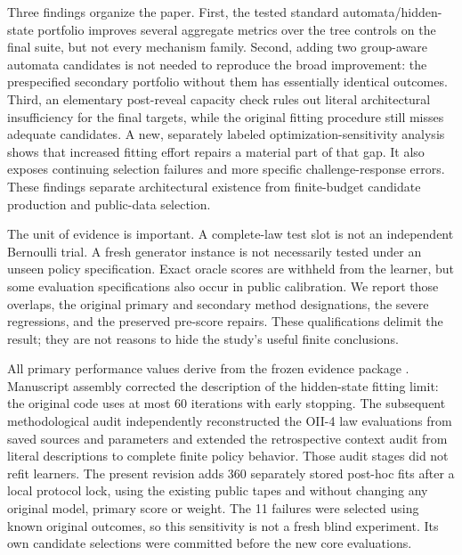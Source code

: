 Three findings organize the paper. First, the tested standard automata/hidden-state portfolio improves several aggregate metrics over the tree controls on the final suite, but not every mechanism family. Second, adding two group-aware automata candidates is not needed to reproduce the broad improvement: the prespecified secondary portfolio without them has essentially identical outcomes. Third, an elementary post-reveal capacity check rules out literal architectural insufficiency for the final targets, while the original fitting procedure still misses adequate candidates. A new, separately labeled optimization-sensitivity analysis shows that increased fitting effort repairs a material part of that gap. It also exposes continuing selection failures and more specific challenge-response errors. These findings separate architectural existence from finite-budget candidate production and public-data selection.

The unit of evidence is important. A complete-law test slot is not an independent Bernoulli trial. A fresh generator instance is not necessarily tested under an unseen policy specification. Exact oracle scores are withheld from the learner, but some evaluation specifications also occur in public calibration. We report those overlaps, the original primary and secondary method designations, the severe regressions, and the preserved pre-score repairs. These qualifications delimit the result; they are not reasons to hide the study's useful finite conclusions.

All primary performance values derive from the frozen evidence package \cite{RodgersEvidence}. Manuscript assembly corrected the description of the hidden-state fitting limit: the original code uses at most 60 iterations with early stopping. The subsequent methodological audit independently reconstructed the OII-4 law evaluations from saved sources and parameters and extended the retrospective context audit from literal descriptions to complete finite policy behavior. Those audit stages did not refit learners. The present revision adds 360 separately stored post-hoc fits after a local protocol lock, using the existing public tapes and without changing any original model, primary score or weight. The 11 failures were selected using known original outcomes, so this sensitivity is not a fresh blind experiment. Its own candidate selections were committed before the new core evaluations.


